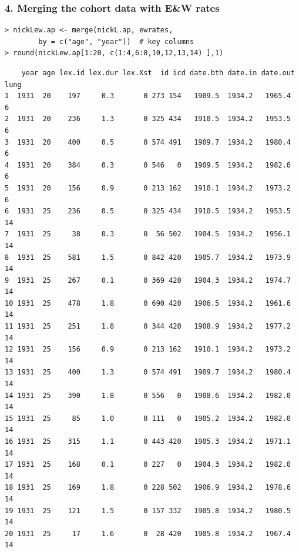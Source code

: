 \documentclass[handout,12pt]{beamer}
\begin{document}
\begin{frame} [fragile]
\frametitle{4. Merging the cohort data with E\&W rates} 
{\small
\renewcommand{\baselinestretch}{0.9}  
\begin{verbatim}   
> nickLew.ap <- merge(nickL.ap, ewrates, 
        by = c("age", "year"))  # key columns
> round(nickLew.ap[1:20, c(1:4,6:8,10,12,13,14) ],1) 
\end{verbatim}  
\renewcommand{\baselinestretch}{1.0} 
}
{\scriptsize
\renewcommand{\baselinestretch}{0.9}  
\begin{verbatim}   
    year age lex.id lex.dur lex.Xst  id icd date.bth date.in date.out lung
1  1931  20    197     0.3       0 273 154   1909.5  1934.2   1965.4    6
2  1931  20    236     1.3       0 325 434   1910.5  1934.2   1953.5    6
3  1931  20    400     0.5       0 574 491   1909.7  1934.2   1980.4    6
4  1931  20    384     0.3       0 546   0   1909.5  1934.2   1982.0    6
5  1931  20    156     0.9       0 213 162   1910.1  1934.2   1973.2    6
6  1931  25    236     0.5       0 325 434   1910.5  1934.2   1953.5   14
7  1931  25     38     0.3       0  56 502   1904.5  1934.2   1956.1   14
8  1931  25    581     1.5       0 842 420   1905.7  1934.2   1973.9   14
9  1931  25    267     0.1       0 369 420   1904.3  1934.2   1974.7   14
10 1931  25    478     1.8       0 690 420   1906.5  1934.2   1961.6   14
11 1931  25    251     1.8       0 344 420   1908.9  1934.2   1977.2   14
12 1931  25    156     0.9       0 213 162   1910.1  1934.2   1973.2   14
13 1931  25    400     1.3       0 574 491   1909.7  1934.2   1980.4   14
14 1931  25    390     1.8       0 556   0   1908.6  1934.2   1982.0   14
15 1931  25     85     1.0       0 111   0   1905.2  1934.2   1982.0   14
16 1931  25    315     1.1       0 443 420   1905.3  1934.2   1971.1   14
17 1931  25    168     0.1       0 227   0   1904.3  1934.2   1982.0   14
18 1931  25    169     1.8       0 228 502   1906.9  1934.2   1978.6   14
19 1931  25    121     1.5       0 157 332   1905.8  1934.2   1980.5   14
20 1931  25     17     1.6       0  28 420   1905.8  1934.2   1967.4   14
\end{verbatim}  
\renewcommand{\baselinestretch}{1.0} 
}

\end{frame}
\end{document}
